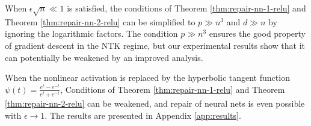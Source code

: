 \begin{remark}
When $\epsilon\sqrt{n}\ll 1$ is satisfied, the conditions of Theorem \ref{thm:repair-nn-1-relu} and Theorem \ref{thm:repair-nn-2-relu} can be simplified to $p\gg n^3$ and $d\gg n$ by ignoring the logarithmic factors. The condition $p\gg n^3$ ensures the good property of gradient descent in the NTK regime, but our experimental results show that it can potentially be weakened by an improved analysis.
\end{remark}

\begin{remark}
When the nonlinear activation is replaced by the hyperbolic tangent function $\psi(t)=\frac{e^t-e^{-t}}{e^t+e^{-t}}$, Conditions of Theorem \ref{thm:repair-nn-1-relu} and Theorem \ref{thm:repair-nn-2-relu} can be weakened, and repair of neural nets is even possible with $\epsilon\rightarrow 1$. The results are presented in Appendix \ref{app:results}.
\end{remark}